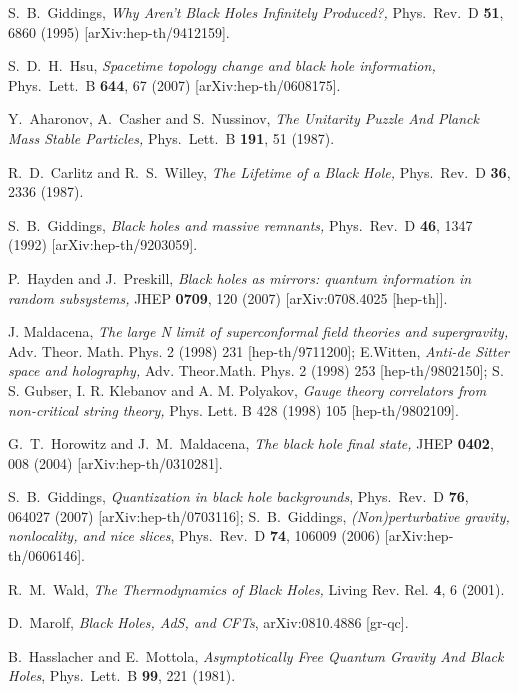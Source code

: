 \documentclass[12pt]{article}
\begin{document}
\begin{thebibliography}{99}
S.~B.~Giddings, {\it Why Aren't Black Holes Infinitely Produced?,} 
Phys.\ Rev.\ D {\bf 51}, 6860 (1995) [arXiv:hep-th/9412159]. %


S.~D.~H.~Hsu, 
{\it Spacetime topology change and black hole information,} 
Phys.\ Lett.\ B {\bf 644}, 67 (2007) [arXiv:hep-th/0608175]. %



Y.~Aharonov, A.~Casher and S.~Nussinov,
{\it The Unitarity Puzzle And Planck Mass Stable Particles,}
Phys.\ Lett.\ B {\bf 191}, 51 (1987).


R.~D.~Carlitz and R.~S.~Willey,
{\it The Lifetime of a Black Hole,}
Phys.\ Rev.\ D {\bf 36}, 2336 (1987).


 S.~B.~Giddings, {\it Black holes and massive remnants,} 
Phys.\ Rev.\ D {\bf 46}, 1347 (1992) [arXiv:hep-th/9203059]. %




P.~Hayden and J.~Preskill, {\it Black holes as mirrors: quantum information in random subsystems,} 
JHEP {\bf 0709}, 120 (2007) [arXiv:0708.4025 [hep-th]]. %



J. Maldacena, {\it The large N limit of superconformal field theories and supergravity,} 
Adv. Theor. Math. Phys. 2 (1998) 231 [hep-th/9711200]; 
 E.Witten, {\it Anti-de Sitter space and holography,} Adv. Theor.Math. Phys. 2 (1998) 253 
[hep-th/9802150]; S. S. Gubser, I. R. Klebanov and A. M. Polyakov, {\it Gauge theory correlators from 
non-critical string theory,} Phys. Lett. B 428 (1998) 105 [hep-th/9802109]. 

  G.~T.~Horowitz and J.~M.~Maldacena,
  {\it The black hole final state,}
  JHEP {\bf 0402}, 008 (2004)
  [arXiv:hep-th/0310281].

S.~B.~Giddings, {\it Quantization in black hole backgrounds}, Phys.\ Rev.\ D {\bf 76}, 064027 (2007) [arXiv:hep-th/0703116]; S.~B.~Giddings, {\it (Non)perturbative gravity, nonlocality, and nice slices}, Phys.\ Rev.\ D {\bf 74}, 106009 (2006) [arXiv:hep-th/0606146]. 

 R.~M.~Wald, {\it The Thermodynamics of Black Holes,} Living Rev. Rel. {\bf 4}, 6 (2001).
 

 D.~Marolf, 
{\it Black Holes, AdS, and CFTs}, arXiv:0810.4886 [gr-qc]. %

B.~Hasslacher and E.~Mottola,
{\it Asymptotically Free Quantum Gravity And Black Holes},
Phys.\ Lett.\ B {\bf 99}, 221 (1981).



\end{thebibliography}
\end{document}
